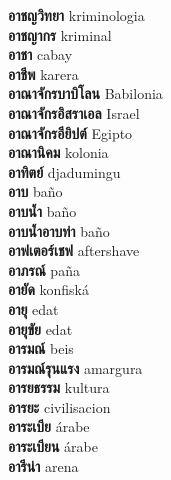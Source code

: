 \textbf{ อาชญวิทยา  } kriminologia \\
\textbf{ อาชญากร  } kriminal \\
\textbf{ อาชา  } cabay \\
\textbf{ อาชีพ  } karera \\
\textbf{ อาณาจักรบาบิโลน  } Babilonia \\
\textbf{ อาณาจักรอิสราเอล  } Israel \\
\textbf{ อาณาจักรอียิปต์  } Egipto \\
\textbf{ อาณานิคม  } kolonia \\
\textbf{ อาทิตย์  } djadumingu \\
\textbf{ อาบ  } baño \\
\textbf{ อาบน้ำ  } baño \\
\textbf{ อาบน้ำอาบท่า  } baño \\
\textbf{ อาฟเตอร์เชฟ  } aftershave \\
\textbf{ อาภรณ์  } paña \\
\textbf{ อายัด  } konfiská \\
\textbf{ อายุ  } edat \\
\textbf{ อายุขัย  } edat \\
\textbf{ อารมณ์  } beis \\
\textbf{ อารมณ์รุนแรง  } amargura \\
\textbf{ อารยธรรม  } kultura \\
\textbf{ อารยะ  } civilisacion \\
\textbf{ อาระเบีย  } árabe \\
\textbf{ อาระเบียน  } árabe \\
\textbf{ อารีน่า  } arena \\
